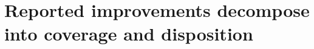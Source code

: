 \section{Reported improvements decompose into coverage and disposition}
\label{sec:decomposition}





